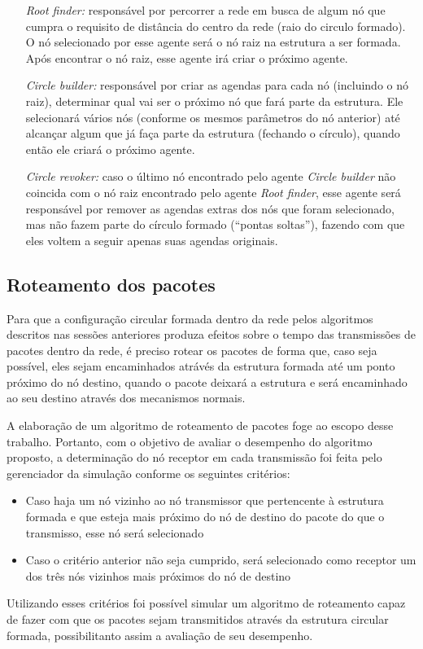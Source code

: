 \begin{itemize}
 \item[\emph{Root finder:}] responsável por percorrer a rede em busca de algum nó que cumpra o requisito de distância do centro da rede (raio do circulo formado). O nó selecionado por esse agente será o nó raiz na estrutura a ser formada. Após encontrar o nó raiz, esse agente irá criar o próximo agente. 
 \item[\emph{Circle builder:}] responsável por criar as agendas para cada nó (incluindo o nó raiz), determinar qual vai ser o próximo nó que fará parte da estrutura. Ele selecionará vários nós (conforme os mesmos parâmetros do nó anterior) até alcançar algum que já faça parte da estrutura (fechando o círculo), quando então ele criará o próximo agente.
 \item[\emph{Circle revoker:}] caso o último nó encontrado pelo agente \emph{Circle builder} não coincida com o nó raiz encontrado pelo agente \emph{Root finder}, esse agente será responsável por remover as agendas extras dos nós que foram selecionado, mas não fazem parte do círculo formado (``pontas soltas''), fazendo com que eles voltem a seguir apenas suas agendas originais.
\end{itemize}

\subsection{Roteamento dos pacotes}

Para que a configuração circular formada dentro da rede pelos algoritmos descritos nas sessões anteriores produza efeitos sobre o tempo das transmissões de pacotes dentro da rede, é preciso rotear os pacotes de forma que, caso seja possível, eles sejam encaminhados atrávés da estrutura formada até um ponto próximo do nó destino, quando o pacote deixará a estrutura e será encaminhado ao seu destino através dos mecanismos normais. 

A elaboração de um algoritmo de roteamento de pacotes foge ao escopo desse trabalho. Portanto, com o objetivo de avaliar o desempenho do algoritmo proposto, a determinação do nó receptor em cada transmissão foi feita pelo gerenciador da simulação conforme os seguintes critérios:

\begin{itemize}
\item Caso haja um nó vizinho ao nó transmissor que pertencente à estrutura formada e que esteja mais próximo do nó de destino do pacote do que o transmisso, esse nó será selecionado
\item Caso o critério anterior não seja cumprido, será selecionado como receptor um dos três nós vizinhos mais próximos do nó de destino
\end{itemize}

Utilizando esses critérios foi possível simular um algoritmo de roteamento capaz de fazer com que os pacotes sejam transmitidos através da estrutura circular formada, possibilitanto assim a avaliação de seu desempenho.

